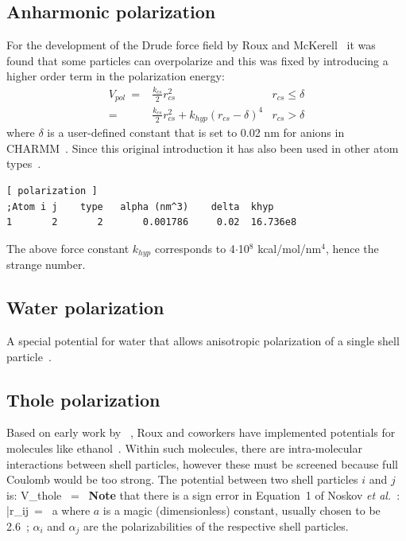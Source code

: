 \subsection{Anharmonic polarization}
For the development of the Drude force field by Roux and McKerell~\cite{Lopes2013a}
it was found
that some particles can overpolarize and this was fixed by introducing
a higher order term in the polarization energy:
\begin{eqnarray}
V_{pol} ~=& \frac{k_{cs}}{2} r_{cs}^2 & r_{cs} \le \delta \\
            =& \frac{k_{cs}}{2} r_{cs}^2 + k_{hyp} (r_{cs}-\delta)^4 & r_{cs} > \delta
\end{eqnarray}
where $\delta$ is a user-defined constant that is set to 0.02 nm for
anions in CHARMM~\cite{HYu2010}. Since this original introduction it
has also been used in other atom types~\cite{Lopes2013a}.
\begin{verbatim}
[ polarization ]
;Atom i j    type   alpha (nm^3)    delta  khyp
1       2       2       0.001786     0.02  16.736e8
\end{verbatim}
The above force constant $k_{hyp}$ corresponds to 4$\cdot$10$^8$
kcal/mol/nm$^4$, hence the strange number.

\subsection{Water polarization}
A special potential for water that allows anisotropic polarization of
a single shell particle~\cite{Maaren2001a}.

\subsection{Thole polarization}
Based on early work by ~\cite{Thole81}, Roux and
coworkers have implemented potentials for molecules like
ethanol~\cite{Lamoureux2003a,Lamoureux2003b,Noskov2005a}. Within such
molecules, there are intra-molecular interactions between shell
particles, however these must be screened because full Coulomb would
be too strong. The potential between two shell particles $i$ and $j$ is:
\newcommand{\rbij}{\bar{r}_{ij}}
\beq
V_{thole} ~=~ \left[1-\left(1+\frac{\rbij}{2}\right){\rm exp}^{-\rbij}\right]
\eeq
{\bf Note} that there is a sign error in Equation~1 of Noskov {\em et al.}~\cite{Noskov2005a}:
\beq
\rbij ~=~ a
\eeq
where $a$ is a magic (dimensionless) constant, usually chosen to be
2.6~\cite{Noskov2005a}; $\alpha_i$ and $\alpha_j$ are the polarizabilities
of the respective shell particles.


